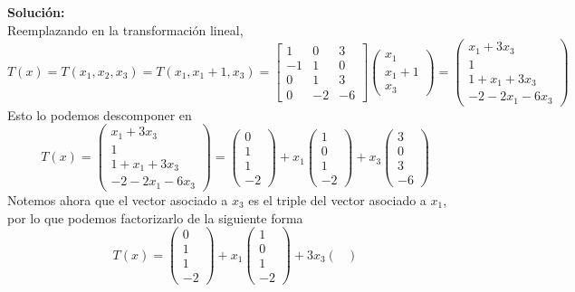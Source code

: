 \documentclass[12pt]{article}
\newenvironment{solucion}
{\begin{mdframed}[backgroundcolor=black!10]
		{\bf Solución:}\\
	}
	{
	\end{mdframed}
}
\newenvironment{preguntas}
{\begin{enumerate}\itemsep12pt
	}
	{
	\end{enumerate}
}
\begin{document}
\begin{preguntas}
\begin{solucion}
Reemplazando en la transformación lineal,
{\small $$T(x) = T(x_1, x_2, x_3) = T(x_1, x_1+1, x_3) = \begin{bmatrix}
1 & 0 & 3\\
-1 & 1 & 0 \\
0 & 1 & 3\\
0 & -2 & -6
\end{bmatrix}
\begin{pmatrix}
x_1 \\
x_1+1\\
x_3
\end{pmatrix} = 
\begin{pmatrix}
x_1 +3x_3\\
1\\
1+x_1+3x_3\\
-2-2x_1-6x_3
\end{pmatrix}$$}
Esto lo podemos descomponer en
$$T(x) = 
\begin{pmatrix}
x_1 +3x_3\\
1\\
1+x_1+3x_3\\
-2-2x_1-6x_3
\end{pmatrix} =
\begin{pmatrix}
0\\
1\\
1\\
-2
\end{pmatrix} +
x_1 \begin{pmatrix}
1\\
0\\
1\\
-2
\end{pmatrix} +
x_3 \begin{pmatrix}
3\\
0\\
3\\
-6
\end{pmatrix}
$$
Notemos ahora que el vector asociado a $x_3$ es el triple del vector asociado a $x_1$, por lo que podemos factorizarlo de la siguiente forma
$$T(x) = 
\begin{pmatrix}
0\\
1\\
1\\
-2
\end{pmatrix} +
x_1 \begin{pmatrix}
1\\
0\\
1\\
-2
\end{pmatrix} +
3x_3 \begin{pmatrix}

\end{pmatrix}$$
\end{solucion}
\end{preguntas}
\end{document}
